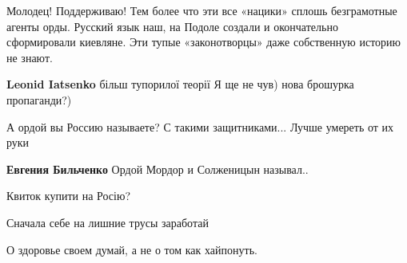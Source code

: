 \begin{itemize}
 

Молодец! Поддерживаю! Тем более что эти все «нацики» сплошь безграмотные агенты
орды. Русский язык наш, на Подоле создали и окончательно сформировали киевляне.
Эти тупые «законотворцы» даже собственную историю не знают.

\begin{itemize}
 
\textbf{Leonid Iatsenko} більш тупорилої теорії Я ще не чув) нова брошурка пропаганди?)

 
А ордой вы Россию называете? С такими защитниками... Лучше умереть от их руки

 
\textbf{Евгения Бильченко} Ордой Мордор и Солженицын называл..
\end{itemize}


Квиток купити на Росію?

\begin{itemize}
 
Сначала себе на лишние трусы заработай
\end{itemize}

 
О здоровье своем думай, а не о том как хайпонуть.

 

\end{itemize}

